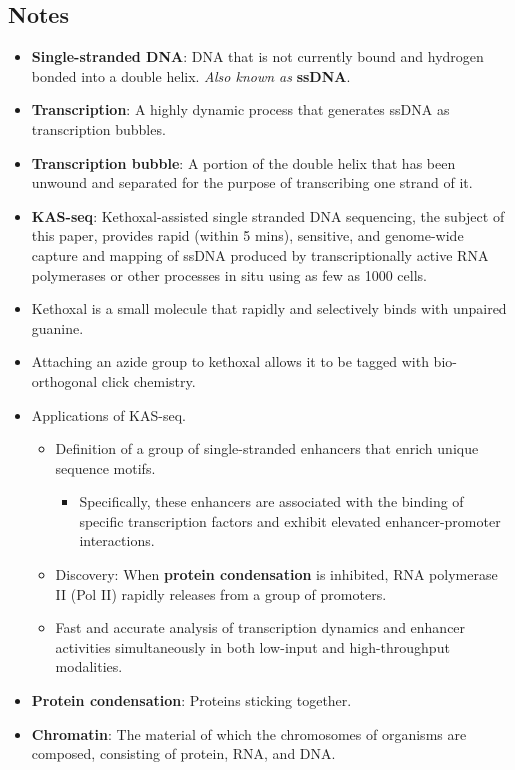 \documentclass[../notes.tex]{subfiles}
\begin{document}
\subsection*{Notes}
\begin{itemize}
    \item {}\textbf{Single-stranded DNA}: DNA that is not currently bound and hydrogen bonded into a double helix. \emph{Also known as} \textbf{ssDNA}.
    \item \textbf{Transcription}: A highly dynamic process that generates ssDNA as transcription bubbles.
    \item \textbf{Transcription bubble}: A portion of the double helix that has been unwound and separated for the purpose of transcribing one strand of it.
    \item \textbf{KAS-seq}: Kethoxal-assisted single stranded DNA sequencing, the subject of this paper, provides rapid (within 5 mins), sensitive, and genome-wide capture and mapping of ssDNA produced by transcriptionally active RNA polymerases or other processes in situ using as few as 1000 cells.
    \item Kethoxal is a small molecule that rapidly and selectively binds with unpaired guanine.
    \item Attaching an azide group to kethoxal allows it to be tagged with bio-orthogonal click chemistry.
    \item Applications of KAS-seq.
    \begin{itemize}
        \item Definition of a group of single-stranded enhancers that enrich unique sequence motifs.
        \begin{itemize}
            \item Specifically, these enhancers are associated with the binding of specific transcription factors and exhibit elevated enhancer-promoter interactions.
        \end{itemize}
        \item Discovery: When \textbf{protein condensation} is inhibited, RNA polymerase II (Pol II) rapidly releases from a group of promoters.
        \item Fast and accurate analysis of transcription dynamics and enhancer activities simultaneously in both low-input and high-throughput modalities.
    \end{itemize}
    \item \textbf{Protein condensation}: Proteins sticking together.
    \item \textbf{Chromatin}: The material of which the chromosomes of organisms are composed, consisting of protein, RNA, and DNA.

\end{itemize}
\end{document}
